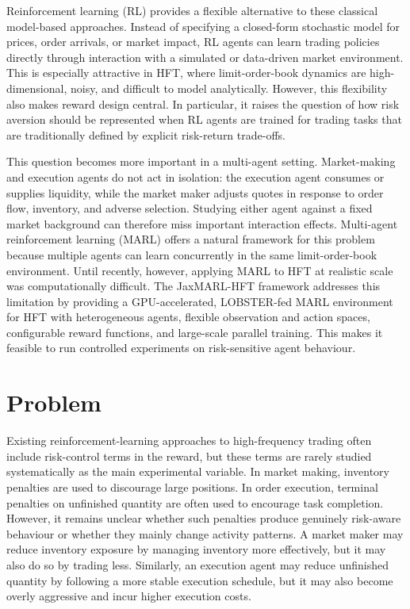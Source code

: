 \documentclass[oneside]{uva-inf-bachelor-thesis}
\begin{document}
Reinforcement learning (RL) provides a flexible alternative to these classical model-based approaches. Instead of specifying a closed-form stochastic model for prices, order arrivals, or market impact, RL agents can learn trading policies directly through interaction with a simulated or data-driven market environment. This is especially attractive in HFT, where limit-order-book dynamics are high-dimensional, noisy, and difficult to model analytically. However, this flexibility also makes reward design central. In particular, it raises the question of how risk aversion should be represented when RL agents are trained for trading tasks that are traditionally defined by explicit risk-return trade-offs.

This question becomes more important in a multi-agent setting. Market-making and execution agents do not act in isolation: the execution agent consumes or supplies liquidity, while the market maker adjusts quotes in response to order flow, inventory, and adverse selection. Studying either agent against a fixed market background can therefore miss important interaction effects. Multi-agent reinforcement learning (MARL) offers a natural framework for this problem because multiple agents can learn concurrently in the same limit-order-book environment. Until recently, however, applying MARL to HFT at realistic scale was computationally difficult. The JaxMARL-HFT framework \cite{mohl_jaxmarl-hft_2025} addresses this limitation by providing a GPU-accelerated, LOBSTER-fed MARL environment for HFT with heterogeneous agents, flexible observation and action spaces, configurable reward functions, and large-scale parallel training. This makes it feasible to run controlled experiments on risk-sensitive agent behaviour.

\section{Problem}

Existing reinforcement-learning approaches to high-frequency trading often include risk-control terms in the reward, but these terms are rarely studied systematically as the main experimental variable. In market making, inventory penalties are used to discourage large positions. In order execution, terminal penalties on unfinished quantity are often used to encourage task completion. However, it remains unclear whether such penalties produce genuinely risk-aware behaviour or whether they mainly change activity patterns. A market maker may reduce inventory exposure by managing inventory more effectively, but it may also do so by trading less. Similarly, an execution agent may reduce unfinished quantity by following a more stable execution schedule, but it may also become overly aggressive and incur higher execution costs.
\end{document}
